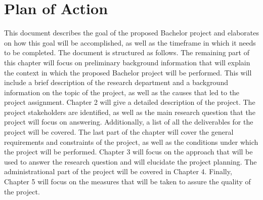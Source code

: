 \section{Plan of Action}
This document describes the goal of the proposed Bachelor project and elaborates on how this goal will be accomplished, as well as the timeframe in which it needs to be completed. The document is structured as follows. The remaining part of this chapter will focus on preliminary background information that will explain the context in which the proposed Bachelor project will be performed. This will include a brief description of the research department and a background information on the topic of the project, as well as the causes that led to the project assignment. Chapter 2 will give a detailed description of the project. The project stakeholders are identified, as well as the main research question that the project will focus on answering. Additionally, a list of all the deliverables for the project will be covered. The last part of the chapter will cover the general requirements and constraints of the project, as well as the conditions under which the project will be performed. Chapter 3 will focus on the approach that will be used to answer the research question and will elucidate the project planning. The administrational part of the project will be covered in Chapter 4. Finally, Chapter 5 will focus on the measures that will be taken to assure the quality of the project.
